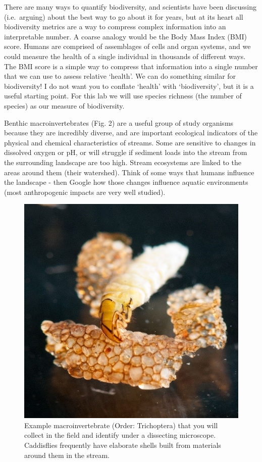 \documentclass[11pt,]{article}
\begin{document}
There are many ways to quantify biodiversity, and scientists have been
discussing (i.e.~arguing) about the best way to go about it for years,
but at its heart all biodiversity metrics are a way to compress complex
information into an interpretable number. A coarse analogy would be the
Body Mass Index (BMI) score. Humans are comprised of assemblages of
cells and organ systems, and we could measure the health of a single
individual in thousands of different ways. The BMI score is a simple way
to compress that information into a single number that we can use to
assess relative `health'. We can do something similar for biodiversity!
I do not want you to conflate `health' with `biodiversity', but it is a
useful starting point. For this lab we will use species richness (the
number of species) as our measure of biodiversity.

Benthic macroinvertebrates (Fig. 2) are a useful group of study
organisms because they are incredibly diverse, and are important
ecological indicators of the physical and chemical characteristics of
streams. Some are sensitive to changes in dissolved oxygen or pH, or
will struggle if sediment loads into the stream from the surrounding
landscape are too high. Stream ecosystems are linked to the areas around
them (their watershed). Think of some ways that humans influence the
landscape - then Google how those changes influence aquatic environments
(most anthropogenic impacts are very well studied).

\begin{figure}

{\centering \includegraphics[width=0.5\linewidth]{../_chapter_materials/invert_pic} 

}

\caption{Example macroinvertebrate (Order: Trichoptera) that you will collect in the field and identify under a dissecting microscope. Caddisflies frequently have elaborate shells built from materials around them in the stream.}\label{fig:invert-fig}
\end{figure}
\end{document}
